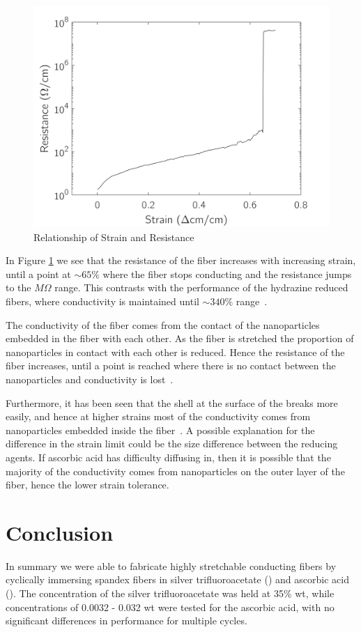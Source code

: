 \documentclass[a4paper, oneside]{discothesis}
\begin{document}
\begin{figure}[ht]
    \centering
    \includegraphics[width=0.7\columnwidth]{figures/strain_graph.png}
    \caption{Relationship of Strain and Resistance}
    \label{fig:strain_resistance}
\end{figure}

In Figure \ref{fig:strain_resistance} we see that the resistance of the fiber increases with increasing strain, until a point at $\sim 65\%$ where the fiber stops conducting and the resistance jumps to the $M\Omega$ range. This contrasts with the performance of the hydrazine reduced fibers, where conductivity is maintained until $\sim 340\%$ range~\cite{jae2018}.

The conductivity of the fiber comes from the contact of the  nanoparticles embedded in the fiber with each other. As the fiber is stretched the proportion of  nanoparticles in contact with each other is reduced. Hence the resistance of the fiber increases, until a point is reached where there is no contact between the  nanoparticles and conductivity is lost~\cite{jae2018,cond_shell}. 

Furthermore, it has been seen that the  shell at the surface of the breaks more easily, and hence at higher strains most of the conductivity comes from  nanoparticles embedded inside the fiber~\cite{jae2018,cond_shell}. A possible explanation for the difference in the strain limit could be the size difference between the reducing agents. If ascorbic acid has difficulty diffusing in, then it is possible that the majority of the conductivity comes from  nanoparticles on the outer layer of the fiber, hence the lower strain tolerance.

\chapter{Conclusion}
In summary we were able to fabricate highly stretchable conducting fibers by cyclically immersing spandex fibers in silver trifluoroacetate 
() and ascorbic acid (). 
The concentration of the silver trifluoroacetate was held at 35\% wt, while concentrations of 0.0032 - 0.032 wt were tested for the ascorbic acid, with no significant differences in performance for multiple cycles.
\end{document}
